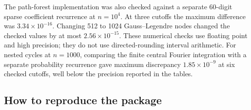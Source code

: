 \documentclass[11pt,letterpaper]{article}
\numberwithin{equation}{section}
\theoremstyle{remark}\newtheorem{remark}[theorem]{Remark}
\theoremstyle{definition}\newtheorem{definition}[theorem]{Definition}\theoremstyle{plain}
\begin{document}
The path-forest implementation was also checked against a
separate 60-digit sparse coefficient recurrence at \(n=10^4\).
At three cutoffs the maximum difference was
\(3.34\times10^{-16}\).
Changing 512 to 1024 Gauss--Legendre nodes changed the checked
values by at most \(2.56\times10^{-15}\).
These numerical checks use floating point and high precision;
they do not use directed-rounding interval arithmetic.
For nested cycles at \(n=1000\), comparing the finite central
Fourier integration with a separate probability recurrence
gave maximum discrepancy \(1.85\times10^{-9}\) at six checked
cutoffs, well below the precision reported in the tables.

\subsection{How to reproduce the package}
\end{document}
